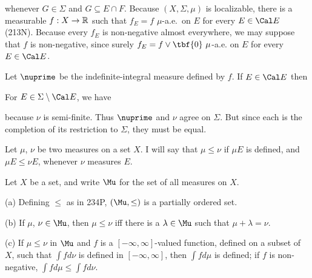 {

\noindent whenever $G\in\Sigma$ and $G\subseteq E\cap F$.   Because
$(X,\Sigma,\mu)$ is localizable, there is a measurable $f:X\to\Bbb R$
such that $f_E=f\,\,\mu$-a.e.\ on $E$ for every $E\in\Cal E$ (213N).
Because every $f_E$ is non-negative almost everywhere, we may suppose
that
$f$ is non-negative, since surely $f_E=f\vee\tbf{0}\,\,\mu$-a.e. on $E$
for
every $E\in\Cal E$.

\medskip

 Let $\nuprime$ be the indefinite-integral measure
defined by $f$.   If $E\in\Cal E$ then

\noindent For $E\in\Sigma\setminus\Cal E$, we have


\noindent because $\nu$ is semi-finite.   Thus $\nuprime$ and $\nu$
agree on $\Sigma$.  But since each is the completion of its restriction
to $\Sigma$, they must be equal.
}%

Let $\mu$, $\nu$ be two measures on a set $X$.
I will say that $\mu\le\nu$ if $\mu E$ is defined, and $\mu E\le\nu E$,
whenever $\nu$ measures $E$.

Let $X$ be a set, and write $\Mu$ for the set of
all measures on $X$.

(a) Defining $\le$ as in 234P, $(\Mu,\le)$ is a partially ordered set.

(b) If $\mu$, $\nu\in\Mu$, then $\mu\le\nu$ iff there is a $\lambda\in\Mu$
such that $\mu+\lambda=\nu$.

(c) If $\mu\le\nu$ in $\Mu$ and $f$ is a $[-\infty,\infty]$-valued
function,
defined on a subset of $X$, such that $\int fd\nu$ is defined in
$[-\infty,\infty]$, then $\int fd\mu$ is defined;  if $f$ is non-negative,
$\int fd\mu\le\int fd\nu$.

